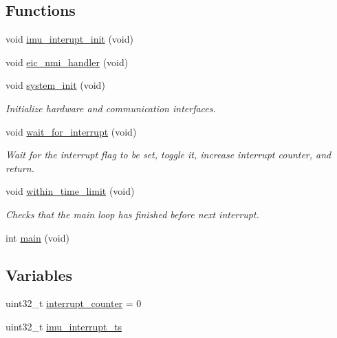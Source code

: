 \subsection*{\-Functions}
\begin{DoxyCompactItemize}
\item 
void \hyperlink{group__openshoe__runtime__framework_gab157d45366997e63d5799b3f93a8ad40}{imu\-\_\-interupt\-\_\-init} (void)
\item 
void \hyperlink{group__openshoe__runtime__framework_ga704ef9a891717a7ad0e0248601e6d8e4}{eic\-\_\-nmi\-\_\-handler} (void)
\item 
void \hyperlink{group__openshoe__runtime__framework_ga43f5e0d6db0fb41a437cc9096b32e9b5}{system\-\_\-init} (void)
\begin{DoxyCompactList}\small\item\em \-Initialize hardware and communication interfaces. \end{DoxyCompactList}\item 
void \hyperlink{group__openshoe__runtime__framework_gaa860f79f0ccbec4ade4b9b5f2173f05a}{wait\-\_\-for\-\_\-interrupt} (void)
\begin{DoxyCompactList}\small\item\em \-Wait for the interrupt flag to be set, toggle it, increase interrupt counter, and return. \end{DoxyCompactList}\item 
void \hyperlink{group__openshoe__runtime__framework_gab84fcc7107ace73c7c806351d3dd27f7}{within\-\_\-time\-\_\-limit} (void)
\begin{DoxyCompactList}\small\item\em \-Checks that the main loop has finished before next interrupt. \end{DoxyCompactList}\item 
int \hyperlink{group__openshoe__runtime__framework_ga840291bc02cba5474a4cb46a9b9566fe}{main} (void)
\end{DoxyCompactItemize}
\subsection*{\-Variables}
\begin{DoxyCompactItemize}
\item 
uint32\-\_\-t \hyperlink{group__openshoe__runtime__framework_gae1dde88f49a15ac8b44d187ed1a2c2f4}{interrupt\-\_\-counter} = 0
\item 
uint32\-\_\-t \hyperlink{group__openshoe__runtime__framework_gabab0bf40697a144a8e46dfe6c4290656}{imu\-\_\-interrupt\-\_\-ts}
\end{DoxyCompactItemize}


